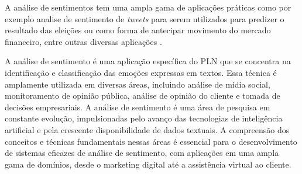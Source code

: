 
A análise de sentimentos tem uma ampla gama de aplicações práticas como por exemplo analise de sentimento de \textit{tweets} para serem utilizados para predizer o resultado das eleições ou como forma de antecipar movimento do mercado financeiro, entre outras diversas aplicações \cite{Liu2012}.

A análise de sentimento é uma aplicação específica do PLN que se concentra na identificação e classificação das emoções expressas em textos. Essa técnica é amplamente utilizada em diversas áreas, incluindo análise de mídia social, monitoramento de opinião pública, análise de opinião do cliente e tomada de decisões empresariais. A análise de sentimento é uma área de pesquisa em constante evolução, impulsionadas pelo avanço das tecnologias de inteligência artificial e pela crescente disponibilidade de dados textuais. A compreensão dos conceitos e técnicas fundamentais nessas áreas é essencial para o desenvolvimento de sistemas eficazes de análise de sentimento, com aplicações em uma ampla gama de domínios, desde o marketing digital até a assistência virtual ao cliente.




